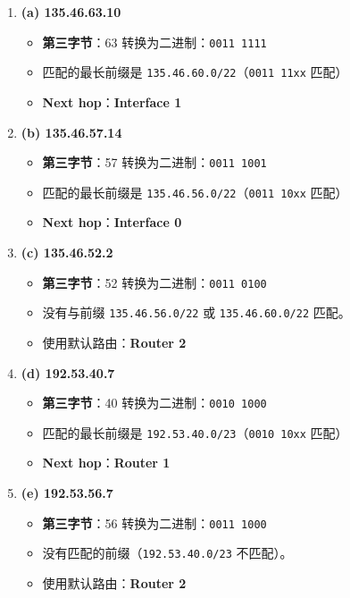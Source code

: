 \begin{enumerate}
    \item \textbf{(a) 135.46.63.10}  
    \begin{itemize}
        \item \textbf{第三字节}：63 转换为二进制：\texttt{0011 1111}
        \item 匹配的最长前缀是 \texttt{135.46.60.0/22}（\texttt{0011 11xx} 匹配）
        \item \textbf{Next hop}：\textbf{Interface 1}
    \end{itemize}

    \item \textbf{(b) 135.46.57.14}  
    \begin{itemize}
        \item \textbf{第三字节}：57 转换为二进制：\texttt{0011 1001}
        \item 匹配的最长前缀是 \texttt{135.46.56.0/22}（\texttt{0011 10xx} 匹配）
        \item \textbf{Next hop}：\textbf{Interface 0}
    \end{itemize}

    \item \textbf{(c) 135.46.52.2}  
    \begin{itemize}
        \item \textbf{第三字节}：52 转换为二进制：\texttt{0011 0100}
        \item 没有与前缀 \texttt{135.46.56.0/22} 或 \texttt{135.46.60.0/22} 匹配。
        \item 使用默认路由：\textbf{Router 2}
    \end{itemize}

    \item \textbf{(d) 192.53.40.7}  
    \begin{itemize}
        \item \textbf{第三字节}：40 转换为二进制：\texttt{0010 1000}
        \item 匹配的最长前缀是 \texttt{192.53.40.0/23}（\texttt{0010 10xx} 匹配）
        \item \textbf{Next hop}：\textbf{Router 1}
    \end{itemize}

    \item \textbf{(e) 192.53.56.7}  
    \begin{itemize}
        \item \textbf{第三字节}：56 转换为二进制：\texttt{0011 1000}
        \item 没有匹配的前缀（\texttt{192.53.40.0/23} 不匹配）。
        \item 使用默认路由：\textbf{Router 2}
    \end{itemize}
\end{enumerate}

